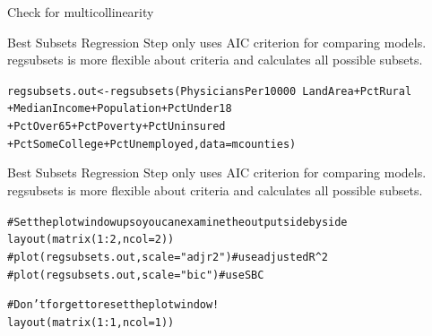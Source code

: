 \documentclass{beamer}\usepackage[]{graphicx}\usepackage[]{color}
\makeatletter
\newcommand{\hlnum}[1]{\textcolor[rgb]{0.824,0.412,0.118}{#1}}%
\newcommand{\hlcom}[1]{\textcolor[rgb]{0.824,0.706,0.549}{#1}}%
\newcommand{\hlopt}[1]{\textcolor[rgb]{1,0.894,0.769}{#1}}%
\newcommand{\hlstd}[1]{\textcolor[rgb]{1,0.894,0.769}{#1}}%
\newcommand{\hlkwb}[1]{\textcolor[rgb]{0.804,0.776,0.451}{#1}}%
\newcommand{\hlkwc}[1]{\textcolor[rgb]{0.78,0.941,0.545}{#1}}%
\newcommand{\hlkwd}[1]{\textcolor[rgb]{1,0.78,0.769}{#1}}%
\newenvironment{kframe}{%
 \def\at@end@of@kframe{}%
 \ifinner\ifhmode%
  \def\at@end@of@kframe{\end{minipage}}%
  \begin{minipage}{\columnwidth}%
 \fi\fi%
 \def\FrameCommand##1{\hskip\@totalleftmargin \hskip-\fboxsep
 \colorbox{shadecolor}{##1}\hskip-\fboxsep
     \hskip-\linewidth \hskip-\@totalleftmargin \hskip\columnwidth}%
 \MakeFramed {\advance\hsize-\width
   \@totalleftmargin\z@ \linewidth\hsize
   \@setminipage}}%
 {\par\unskip\endMakeFramed%
 \at@end@of@kframe}
\newenvironment{knitrout}{}{} %
\makeatother
\begin{document}
\begin{darkframes}
\begin{frame}[fragile]{Check for multicollinearity}
    \end{frame}


    \begin{frame}[fragile]{Best Subsets Regression}
      \fontsize{8}{8}\selectfont
     Step only uses AIC criterion for comparing models. regsubsets is more flexible about criteria and calculates all possible subsets. 

\begin{knitrout}
\begin{kframe}
\begin{alltt}
\hlstd{regsubsets.out} \hlkwb{<-} \hlkwd{regsubsets}\hlstd{(PhysiciansPer10000} \hlopt{~} \hlstd{LandArea} \hlopt{+} \hlstd{PctRural}
                             \hlopt{+} \hlstd{MedianIncome} \hlopt{+} \hlstd{Population} \hlopt{+} \hlstd{PctUnder18}
                             \hlopt{+} \hlstd{PctOver65} \hlopt{+} \hlstd{PctPoverty} \hlopt{+} \hlstd{PctUninsured}
                             \hlopt{+} \hlstd{PctSomeCollege} \hlopt{+} \hlstd{PctUnemployed,} \hlkwc{data}\hlstd{=mcounties)}
\end{alltt}
\end{kframe}
\end{knitrout}

    \end{frame}


    \begin{frame}[fragile]{Best Subsets Regression}
    \fontsize{8}{8}\selectfont
     Step only uses AIC criterion for comparing models. regsubsets is more flexible about criteria and calculates all possible subsets. 
      
\begin{knitrout}
\begin{kframe}
\begin{alltt}
\hlcom{# Set the plot window up so you can examine the output side by side}
\hlkwd{layout}\hlstd{(}\hlkwd{matrix}\hlstd{(}\hlnum{1}\hlopt{:}\hlnum{2}\hlstd{,} \hlkwc{ncol}\hlstd{=}\hlnum{2}\hlstd{))}
\hlcom{#plot(regsubsets.out, scale="adjr2")  # use adjusted R^2}
\hlcom{#plot(regsubsets.out, scale="bic")    # use SBC}

\hlcom{# Don't forget to reset the plot window!}
\hlkwd{layout}\hlstd{(}\hlkwd{matrix}\hlstd{(}\hlnum{1}\hlopt{:}\hlnum{1}\hlstd{,} \hlkwc{ncol}\hlstd{=}\hlnum{1}\hlstd{))}
\end{alltt}
\end{kframe}
\end{knitrout}


\end{frame}
\end{darkframes}
\end{document}
